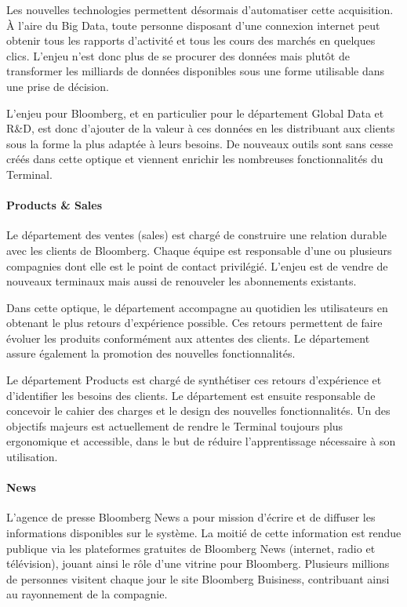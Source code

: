 \documentclass[11pt, oneside, titlepage, a4paper]{article}
\begin{document}
Les nouvelles technologies permettent désormais d'automatiser cette acquisition. À l'aire du Big Data, toute personne disposant d'une connexion internet peut obtenir tous les rapports d'activité et tous les cours des marchés en quelques clics. L'enjeu n'est donc plus de se procurer des données mais plutôt de transformer les milliards de données disponibles sous une forme utilisable dans une prise de décision. 

L'enjeu pour Bloomberg, et en particulier pour le département Global Data et R\&D, est donc d'ajouter de la valeur à ces données en les distribuant aux clients sous la forme la plus adaptée à leurs besoins. De nouveaux outils sont sans cesse créés dans cette optique et viennent enrichir les nombreuses fonctionnalités du Terminal.
\paragraph{Products \& Sales}
Le département des ventes (sales) est chargé de construire une relation durable avec les clients de Bloomberg. Chaque équipe est responsable d'une ou plusieurs compagnies dont elle est le point de contact privilégié. L'enjeu est de vendre de nouveaux terminaux mais aussi de renouveler les abonnements existants.

Dans cette optique, le département accompagne au quotidien les utilisateurs en obtenant le plus retours d'expérience possible. Ces retours permettent de faire évoluer les produits conformément aux attentes des clients. Le département assure également la promotion des nouvelles fonctionnalités.

Le département Products est chargé de synthétiser ces retours d'expérience et d'identifier les besoins des clients. Le département est ensuite responsable de concevoir le cahier des charges et le design des nouvelles fonctionnalités. Un des objectifs majeurs est actuellement de rendre le Terminal toujours plus ergonomique et accessible, dans le but de réduire l'apprentissage nécessaire à son utilisation.
\paragraph{News}
L'agence de presse Bloomberg News a pour mission d'écrire et de diffuser les informations disponibles sur le système. La moitié de cette information est rendue publique via les plateformes gratuites de Bloomberg News (internet, radio et télévision), jouant ainsi le rôle d'une vitrine pour Bloomberg. Plusieurs millions de personnes visitent chaque jour le site Bloomberg Buisiness, contribuant ainsi au rayonnement de la compagnie.
\end{document}
